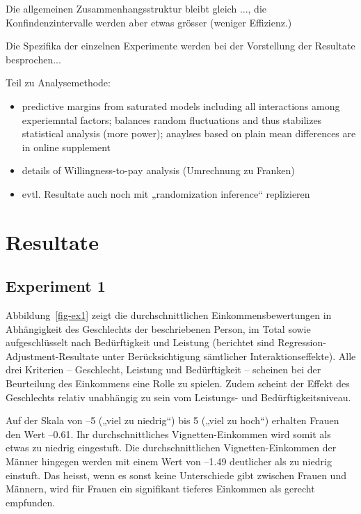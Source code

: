 \documentclass[a4paper,12pt]{article}
\renewcommand{\baselinestretch}{1.1}
\newif\ifcomments
\newcommand{\comment}[1]{%
    \ifcomments\marginpar{\renewcommand{\baselinestretch}{1}\tiny\hspace*{-1.1em}\colorbox{gray!20}%
    {\textcolor{red}{\parbox[t]{.9in}{\raggedright #1}}}}\fi}
\begin{document}
Die allgemeinen Zusammenhangsstruktur bleibt gleich ..., die Konfindenzintervalle werden aber etwas grösser (weniger Effizienz.)

Die Spezifika der einzelnen Experimente werden bei der Vorstellung der Resultate besprochen...

Teil zu Analysemethode: 
\begin{itemize}
    \item predictive margins from saturated models including all interactions among experiemntal factors; balances random 
fluctuations and thus stabilizes statistical analysis (more power); anaylses based on plain mean differences are in online supplement 
    \item details of Willingness-to-pay analysis (Umrechnung zu Franken)
    \item evtl. Resultate auch noch mit „randomization inference“ replizieren
\end{itemize}


\section{Resultate}
\label{sec:s4}

\subsection{Experiment 1}
\comment{Teile der Beschreibung der Daten könnten in den Abschnitt „Daten und Methode“}


Abbildung~\ref{fig-ex1} zeigt die durchschnittlichen Einkommensbewertungen in
Abhängigkeit des Geschlechts der beschriebenen Person, im Total sowie
aufgeschlüsselt nach Bedürftigkeit und Leistung (berichtet sind Regression-Adjustment-Resultate unter 
Berücksichtigung sämtlicher Interaktionseffekte). Alle drei Kriterien --
Geschlecht, Leistung und Bedürftigkeit -- scheinen bei der Beurteilung des
Einkommens eine Rolle zu spielen. Zudem scheint der Effekt des Geschlechts
relativ unabhängig zu sein vom Leistungs- und Bedürftigkeitsniveau.


Auf der Skala von --5 („viel zu niedrig“) bis 5 („viel zu hoch“) erhalten
Frauen den Wert --0.61. Ihr durchschnittliches Vignetten-Einkommen wird somit
als etwas zu niedrig eingestuft. Die durchschnittlichen Vignetten-Einkommen der
Männer hingegen werden mit einem Wert von --1.49 deutlicher als zu niedrig
einstuft. Das heisst, wenn es sonst keine Unterschiede gibt zwischen Frauen und
Männern, wird für Frauen ein signifikant tieferes Einkommen als gerecht
empfunden.
\end{document}
